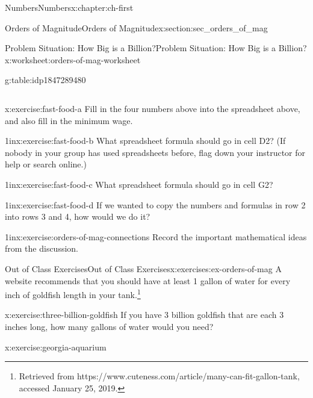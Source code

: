\documentclass[twoside,10pt,]{book}
\numberwithin{equation}{chapter}
\begin{document}
\begin{chapterptx}{Numbers}{}{Numbers}{}{}{x:chapter:ch-first}
\begin{sectionptx}{Orders of Magnitude}{}{Orders of Magnitude}{}{}{x:section:sec_orders_of_mag}
\begin{worksheet-subsection-numberless}{Problem Situation: How Big is a Billion?}{}{Problem Situation: How Big is a Billion?}{}{}{x:worksheet:orders-of-mag-worksheet}
\begin{tableptx}{\textbf{}}{g:table:idp1847289480}{}
{\begin{tabular}{Bllllllll}
\end{tabular}
}%
\end{tableptx}%
\begin{exercisegroup}
\begin{divisionexerciseeg}{23}{}{}{x:exercise:fast-food-a}%
Fill in the four numbers above into the spreadsheet above, and also fill in the minimum wage.\end{divisionexerciseeg}%
\begin{divisionexerciseeg}{24}{}{1in}{x:exercise:fast-food-b}%
What spreadsheet formula should go in cell D2? (If nobody in your group has used spreadsheets before, flag down your instructor for help or search online.)\end{divisionexerciseeg}%
\begin{divisionexerciseeg}{25}{}{1in}{x:exercise:fast-food-c}%
What spreadsheet formula should go in cell G2?\end{divisionexerciseeg}%
\begin{divisionexerciseeg}{26}{}{1in}{x:exercise:fast-food-d}%
If we wanted to copy the numbers and formulas in row 2 into rows 3 and 4, how would we do it?\end{divisionexerciseeg}%
\begin{divisionexerciseeg}{27}{}{1in}{x:exercise:orders-of-mag-connections}%
Record the important mathematical ideas from the discussion.\end{divisionexerciseeg}%
\end{exercisegroup}
\par\medskip\noindent
\end{worksheet-subsection-numberless}
\restoregeometry
%
%
\typeout{************************************************}
\typeout{************************************************}
%
\begin{exercises-subsection-numberless}{Out of Class Exercises}{}{Out of Class Exercises}{}{}{x:exercises:ex-orders-of-mag}
A website recommends that you should have at least 1 gallon of water for every inch of goldfish length in your tank.\footnote{Retrieved from https:\slash{}\slash{}www.cuteness.com\slash{}article\slash{}many-can-fit-gallon-tank, accessed January 25, 2019.\label{g:fn:idp1847361416}}%
\begin{divisionexercise}{1}{}{}{x:exercise:three-billion-goldfish}%
If you have 3 billion goldfish that are each 3 inches long, how many gallons of water would you need?\end{divisionexercise}%
\begin{divisionexercise}{2}{}{}{x:exercise:georgia-aquarium}%

\end{divisionexercise}
\end{exercises-subsection-numberless}
\end{sectionptx}
\end{chapterptx}
\end{document}
